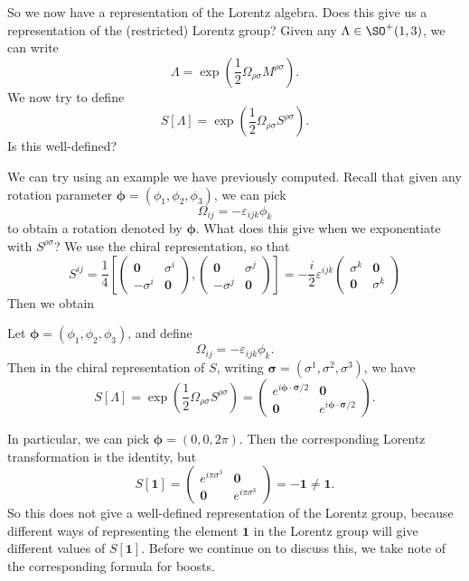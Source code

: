 \documentclass[a4paper]{article}
\begin{document}
So we now have a representation of the Lorentz algebra. Does this give us a representation of the (restricted) Lorentz group? Given any $\Lambda \in \SO^+(1, 3)$, we can write
\[
  \Lambda = \exp\left(\frac{1}{2}\Omega_{\rho\sigma} M^{\rho\sigma}\right).
\]
We now try to define
\[
  S[\Lambda] = \exp\left(\frac{1}{2} \Omega_{\rho\sigma} S^{\rho\sigma}\right).
\]
Is this well-defined?

We can try using an example we have previously computed. Recall that given any rotation parameter $\boldsymbol\phi = (\phi_1, \phi_2, \phi_3)$, we can pick
\[
  \Omega_{ij} = - \varepsilon_{ijk} \phi_k
\]
to obtain a rotation denoted by $\boldsymbol\phi$. What does this give when we exponentiate with $S^{\rho\sigma}$? We use the chiral representation, so that
\[
  S^{ij} = \frac{1}{4}\left[
    \begin{pmatrix}
      \mathbf{0} & \sigma^i\\
      -\sigma^i & \mathbf{0}
    \end{pmatrix},
    \begin{pmatrix}
      \mathbf{0} & \sigma^j\\
      -\sigma^j & \mathbf{0}
  \end{pmatrix}\right] = -\frac{i}{2} \varepsilon^{ijk}
  \begin{pmatrix}
    \sigma^k & \mathbf{0}\\
    \mathbf{0} & \sigma^k
  \end{pmatrix}
\]
Then we obtain
\begin{prop}
  Let $\boldsymbol\phi = (\phi_1, \phi_2, \phi_3)$, and define
  \[
    \Omega_{ij} = - \varepsilon_{ijk} \phi_k.
  \]
  Then in the chiral representation of $S$, writing $\boldsymbol\sigma=(\sigma^1,\sigma^2,\sigma^3)$, we have
  \[
    S[\Lambda] = \exp\left(\frac{1}{2} \Omega_{\rho\sigma} S^{\rho \sigma}\right)
    =
    \begin{pmatrix}
      e^{i\boldsymbol\phi \cdot \boldsymbol\sigma/2} & \mathbf{0}\\
      \mathbf{0} & e^{i \boldsymbol\phi \cdot \boldsymbol \sigma/2}
    \end{pmatrix}.
  \]
\end{prop}
In particular, we can pick $\boldsymbol\phi = (0, 0, 2\pi)$. Then the corresponding Lorentz transformation is the identity, but
\[
  S[\mathbf{1}] =
  \begin{pmatrix}
    e^{i\pi \sigma^3} & \mathbf{0}\\
    \mathbf{0} & e^{i\pi \sigma^3}
  \end{pmatrix} = -\mathbf{1} \not= \mathbf{1}.
\]
So this does not give a well-defined representation of the Lorentz group, because different ways of representing the element $\mathbf{1}$ in the Lorentz group will give different values of $S[\mathbf{1}]$. Before we continue on to discuss this, we take note of the corresponding formula for boosts.
\end{document}
